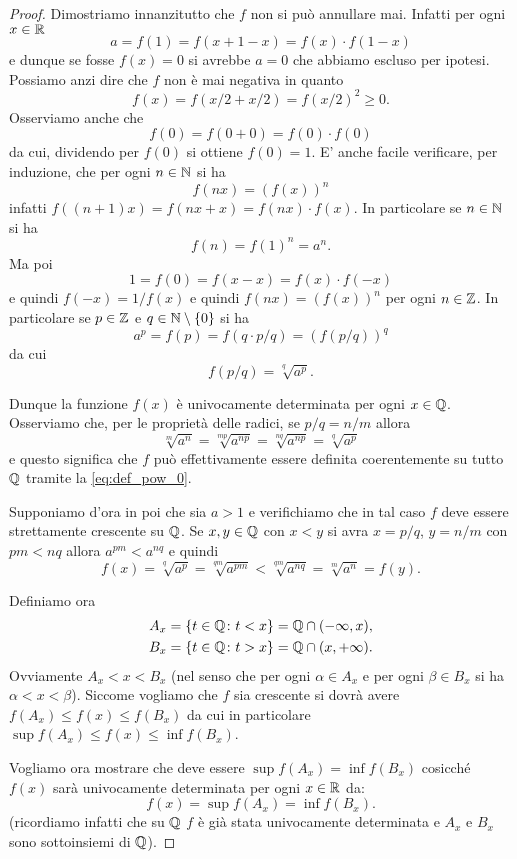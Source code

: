 \begin{proof}
Dimostriamo innanzitutto che $f$ non si può annullare mai.
Infatti per ogni $x\in \mathbb R$
\[
   a = f(1) = f(x+1-x) = f(x)\cdot f(1-x)
\]
e dunque se fosse $f(x)=0$ si avrebbe $a=0$ che abbiamo escluso per ipotesi.
Possiamo anzi dire che $f$ non è mai negativa in quanto
\[
  f(x) = f(x/2 + x/2) = f(x/2)^2 \ge 0.
\]
Osserviamo anche che
\[
  f(0) = f(0+0) = f(0)\cdot f(0)
\]
da cui, dividendo per $f(0)$ si ottiene $f(0)=1$.
E' anche facile verificare, per induzione, che
per ogni $n\in \mathbb N$ si ha
\[
 f(nx) = (f(x))^n
\]
infatti $f((n+1)x) = f(nx+x)=f(nx)\cdot f(x)$.
In particolare se $n\in \mathbb N$ si ha
\[
  f(n) = f(1)^n = a^n.
\]
Ma poi
\[
1=f(0) = f(x-x) = f(x)\cdot f(-x)
\]
e quindi $f(-x)=1/f(x)$ e quindi $f(nx) = (f(x))^n$ per ogni $n\in \mathbb Z$.
In particolare se $p\in \mathbb Z$ e $q \in \mathbb N\setminus\{0\}$ si ha
\[
 a^p = f(p) = f(q\cdot p/q) = (f(p/q))^q
\]
da cui
\begin{equation}\label{eq:def_pow_0}
 f(p/q) = \sqrt[q]{a^p}.
\end{equation}

Dunque la funzione $f(x)$ è univocamente determinata per ogni $x\in \mathbb Q$.
Osserviamo che, per le proprietà delle radici, se $p/q = n/m$ allora
\[
 \sqrt[m]{a^n}
 = \sqrt[mp]{a^{np}}
 = \sqrt[nq]{a^{np}}
 = \sqrt[q]{a^p}
\]
e questo significa che $f$ può effettivamente essere definita
coerentemente su tutto $\mathbb Q$
tramite
la \eqref{eq:def_pow_0}.

Supponiamo d'ora in poi che sia $a>1$
e verifichiamo che in tal caso $f$ deve essere strettamente crescente su $\mathbb Q$.
Se $x,y \in \mathbb Q$
con $x<y$ si avra $x=p/q$, $y=n/m$ con $pm < nq$ allora
$a^{pm} < a^{nq}$ e quindi
\[
f(x)
= \sqrt[q]{a^p}
= \sqrt[qm]{a^{pm}}
< \sqrt[qm]{a^{nq}}
= \sqrt[m]{a^n}
= f(y).
\]

Definiamo ora
\begin{align*}
  A_x &= \{t\in \mathbb Q\colon t<x\} = \mathbb Q \cap (-\infty,x),
  \\
  B_x &= \{t\in \mathbb Q\colon t>x\} = \mathbb Q \cap (x,+\infty).
\end{align*}
Ovviamente $A_x < x < B_x$ (nel senso che per ogni $\alpha \in A_x$
e per ogni $\beta \in B_x$ si ha $\alpha < x < \beta$).
Siccome vogliamo che $f$ sia crescente si dovrà avere
$f(A_x) \le f(x) \le f(B_x)$ da cui in particolare
$\sup f(A_x) \le f(x) \le \inf f(B_x)$.

Vogliamo ora mostrare che deve essere
$\sup f(A_x) = \inf f(B_x)$
cosicché $f(x)$ sarà univocamente determinata
per ogni $x\in \mathbb R$ da:
\begin{equation}\label{eq:def_pow_2}
  f(x) = \sup f(A_x) = \inf f(B_x).
\end{equation}
(ricordiamo infatti che su $\mathbb Q$ $f$ è già stata univocamente determinata
e $A_x$ e $B_x$ sono sottoinsiemi di $\mathbb Q$).


\end{proof}
